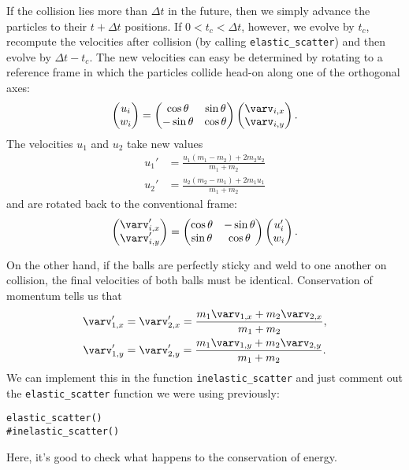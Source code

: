 \documentclass[11pt]{article}
\begin{document}
If the collision lies more than $\Delta t$ in the future, then we simply
advance the particles to their $t+\Delta t$ positions. If 
$0 < t_c < \Delta t$, however, we evolve by $t_c$, recompute the 
velocities after collision (by calling \verb!elastic_scatter!) and then
evolve by $\Delta t - t_c$. The new velocities can easy be determined by
rotating to a reference frame in which the particles collide head-on along
one of the orthogonal axes:
\[ \begin{pmatrix}
u_i \\
w_i
\end{pmatrix}
= \begin{pmatrix}
\cos \theta & \sin \theta\\
-\sin \theta & \cos \theta
\end{pmatrix}
\begin{pmatrix}
\varv_{i,x}\\
\varv_{i,y}
\end{pmatrix}.
\]
The velocities $u_1$ and $u_2$ take new values
\begin{align*}
 u_1' &= \frac{u_1(m_1-m_2)+2m_2u_2}{m_1+m_2}\\
 u_2' &= \frac{u_2(m_2-m_1)+2m_1u_1}{m_1+m_2}
\end{align*}
and are rotated back to the conventional frame:
\[\begin{pmatrix}
\varv_{i,x}'\\
\varv_{i,y}'
\end{pmatrix}
= \begin{pmatrix}
\cos \theta & -\sin \theta\\
\sin \theta & \cos \theta
\end{pmatrix}
\begin{pmatrix}
u_i' \\
w_i
\end{pmatrix}.
\]

On the other hand, if the balls are perfectly sticky and weld to one
another on collision, the final velocities of both balls must be identical.
Conservation of momentum tells us that
\begin{align*}
   \varv'_{1,x} &= \varv'_{2,x} = \frac{m_1\varv_{1,x} 
                                  + m_2\varv_{2,x}}{m_1+m_2},\\
   \varv'_{1,y} &= \varv'_{2,y} = \frac{m_1\varv_{1,y} 
                                  + m_2\varv_{2,y}}{m_1+m_2}.
\end{align*}
We can implement this in the function \verb!inelastic_scatter! and just
comment out the \verb!elastic_scatter! function we were using previously:
\small\begin{verbatim}
elastic_scatter()
#inelastic_scatter()
\end{verbatim}
Here, it's good to check what happens to the conservation of energy.
\end{document}
